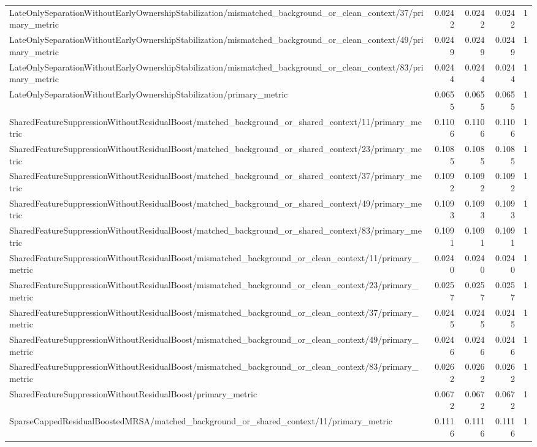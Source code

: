 \begin{table}[h]
\begin{tabular}{lrrrr}
LateOnlySeparationWithoutEarlyOwnershipStabilization/mismatched_background_or_clean_context/37/primary_metric & 0.0242 & 0.0242 & 0.0242 & 1 \\
LateOnlySeparationWithoutEarlyOwnershipStabilization/mismatched_background_or_clean_context/49/primary_metric & 0.0249 & 0.0249 & 0.0249 & 1 \\
LateOnlySeparationWithoutEarlyOwnershipStabilization/mismatched_background_or_clean_context/83/primary_metric & 0.0244 & 0.0244 & 0.0244 & 1 \\
LateOnlySeparationWithoutEarlyOwnershipStabilization/primary_metric & 0.0655 & 0.0655 & 0.0655 & 1 \\
SharedFeatureSuppressionWithoutResidualBoost/matched_background_or_shared_context/11/primary_metric & 0.1106 & 0.1106 & 0.1106 & 1 \\
SharedFeatureSuppressionWithoutResidualBoost/matched_background_or_shared_context/23/primary_metric & 0.1085 & 0.1085 & 0.1085 & 1 \\
SharedFeatureSuppressionWithoutResidualBoost/matched_background_or_shared_context/37/primary_metric & 0.1092 & 0.1092 & 0.1092 & 1 \\
SharedFeatureSuppressionWithoutResidualBoost/matched_background_or_shared_context/49/primary_metric & 0.1093 & 0.1093 & 0.1093 & 1 \\
SharedFeatureSuppressionWithoutResidualBoost/matched_background_or_shared_context/83/primary_metric & 0.1091 & 0.1091 & 0.1091 & 1 \\
SharedFeatureSuppressionWithoutResidualBoost/mismatched_background_or_clean_context/11/primary_metric & 0.0240 & 0.0240 & 0.0240 & 1 \\
SharedFeatureSuppressionWithoutResidualBoost/mismatched_background_or_clean_context/23/primary_metric & 0.0257 & 0.0257 & 0.0257 & 1 \\
SharedFeatureSuppressionWithoutResidualBoost/mismatched_background_or_clean_context/37/primary_metric & 0.0245 & 0.0245 & 0.0245 & 1 \\
SharedFeatureSuppressionWithoutResidualBoost/mismatched_background_or_clean_context/49/primary_metric & 0.0246 & 0.0246 & 0.0246 & 1 \\
SharedFeatureSuppressionWithoutResidualBoost/mismatched_background_or_clean_context/83/primary_metric & 0.0262 & 0.0262 & 0.0262 & 1 \\
SharedFeatureSuppressionWithoutResidualBoost/primary_metric & 0.0672 & 0.0672 & 0.0672 & 1 \\
SparseCappedResidualBoostedMRSA/matched_background_or_shared_context/11/primary_metric & 0.1116 & 0.1116 & 0.1116 & 1 \\

\end{tabular}
\end{table}
